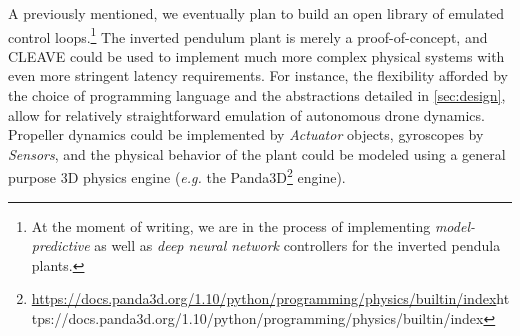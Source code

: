 A previously mentioned, we eventually plan to build an open library of emulated control loops.\footnote{%
    At the moment of writing, we are in the process of implementing \emph{model-predictive} as well as \emph{deep neural network} controllers for the inverted pendula plants.%
}
The inverted pendulum plant is merely a proof-of-concept, and \ac{CLEAVE} could be used to implement much more complex physical systems with even more stringent latency requirements.
For instance, the flexibility afforded by the choice of programming language and the abstractions detailed in \cref{sec:design}, allow for relatively straightforward emulation of autonomous drone dynamics.
Propeller dynamics could be implemented by \emph{Actuator} objects, gyroscopes by \emph{Sensors}, and the physical behavior of the plant could be modeled using a general purpose 3D physics engine (\emph{e.g.} the Panda3D\footnote{\url{https://docs.panda3d.org/1.10/python/programming/physics/builtin/index}{https://docs.panda3d.org/1.10/python/programming/physics/builtin/index}} engine).

